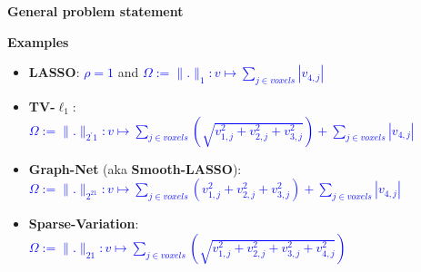 \documentclass[french]{STIC_poster}
\begin{document}
\begin{frame}[t]
\begin{columns}[t]
\begin{column}{.48\linewidth}
\begin{sxbox}[\textwidth]{\textbf{General problem statement}}
\begin{itemize}
\begin{abox}{\textbf{Examples}}
                                  \begin{itemize}
                                  \item \textbf{LASSO}: \textcolor{blue}{$\rho=1$} and \textcolor{blue}{$\Omega:=\|.\|_1: v \mapsto \sum_{j\in voxels}{|v_{4,j}|}$}
                                  \item \textbf{TV-$\ell_1$}:
                                    \textcolor{blue}{$\Omega:=\|.\|_{2^{'}1}:v \mapsto \sum_{j \in voxels}{\left(\sqrt{v_{1,j}^2 + v_{2,j}^2 + v_{3,j}^2}\right)} + \sum_{j \in voxels}{|v_{4,j}|}$}
                                  \item \textbf{Graph-Net} (aka \textbf{Smooth-LASSO}):\\
                                    \textcolor{blue}{$\Omega:=\|.\|_{2^21}:v \mapsto \sum_{j \in voxels}{\left(v_{1,j}^2 + v_{2,j}^2 + v_{3,j}^2\right)} + \sum_{j \in voxels}{|v_{4,j}|}$}
                                  \item \textbf{Sparse-Variation}:\\
                                    \textcolor{blue}{$\Omega:=\|.\|_{21}:v \mapsto \sum_{j \in voxels}{\left(\sqrt{v_{1,j}^2 + v_{2,j}^2 + v_{3,j}^2 + v_{4,j}^2}\right)}$}
                                  \end{itemize}
                                  \end{abox}
                                  \end{itemize}


\end{sxbox}
\end{column}
\end{columns}
\end{frame}
\end{document}
